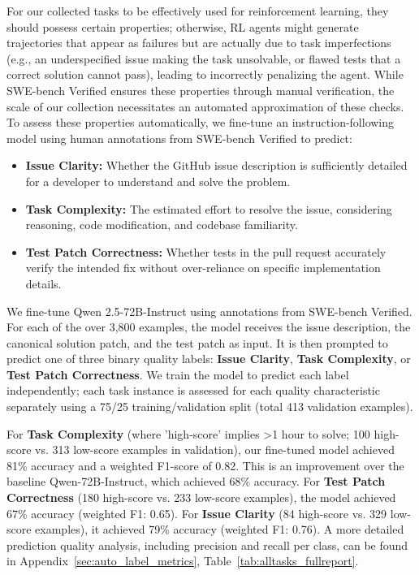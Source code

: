 \documentclass[dandb]{article}
\begin{document}
For our collected tasks to be effectively used for reinforcement learning, they should possess certain properties; otherwise, RL agents might generate trajectories that appear as failures but are actually due to task imperfections (e.g., an underspecified issue making the task unsolvable, or flawed tests that a correct solution cannot pass), leading to incorrectly penalizing the agent. While SWE-bench Verified ensures these properties through manual verification, the scale of our collection necessitates an automated approximation of these checks. To assess these properties automatically, we fine-tune an instruction-following model using human annotations from SWE-bench Verified to predict:
\begin{itemize}
    \item \textbf{Issue Clarity:} Whether the GitHub issue description is sufficiently detailed for a developer to understand and solve the problem.
    \item \textbf{Task Complexity:} The estimated effort to resolve the issue, considering reasoning, code modification, and codebase familiarity.
    \item \textbf{Test Patch Correctness:} Whether tests in the pull request accurately verify the intended fix without over-reliance on specific implementation details.
\end{itemize}

We fine-tune Qwen 2.5-72B-Instruct using annotations from SWE-bench Verified. For each of the over 3,800 examples, the model receives the issue description, the canonical solution patch, and the test patch as input. It is then prompted to predict one of three binary quality labels: \textbf{Issue Clarity}, \textbf{Task Complexity}, or \textbf{Test Patch Correctness}. We train the model to predict each label independently; each task instance is assessed for each quality characteristic separately using a 75/25 training/validation split (total 413 validation examples).

For \textbf{Task Complexity} (where 'high-score' implies >1 hour to solve; 100 high-score vs. 313 low-score examples in validation), our fine-tuned model achieved 81\% accuracy and a weighted F1-score of 0.82. This is an improvement over the baseline Qwen-72B-Instruct, which achieved 68\% accuracy. For \textbf{Test Patch Correctness} (180 high-score vs. 233 low-score examples), the model achieved 67\% accuracy (weighted F1: 0.65). For \textbf{Issue Clarity} (84 high-score vs. 329 low-score examples), it achieved 79\% accuracy (weighted F1: 0.76). A more detailed prediction quality analysis, including precision and recall per class, can be found in Appendix~\ref{sec:auto_label_metrics}, Table~\ref{tab:alltasks_fullreport}.
\end{document}
